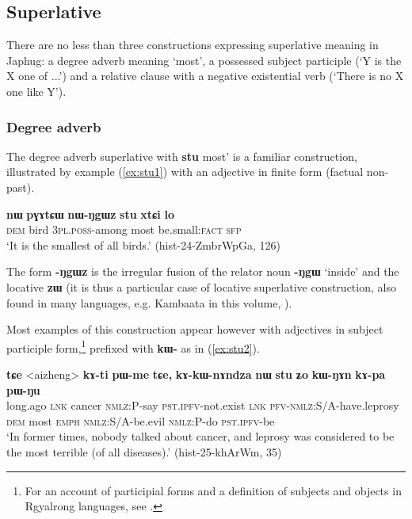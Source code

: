 \documentclass[oneside,a4paper,11pt]{article}
\newcommand{\ipa}[1]{{\phon\textbf{#1}}}
\begin{document}
\subsection{Superlative}
There are no less than three constructions expressing superlative meaning in Japhug: a degree adverb meaning `most', a possessed subject participle (`Y is the X one of ...') and a relative clause with a negative existential verb (`There is no X one like Y').

 \subsubsection{Degree adverb}
 The degree adverb superlative with \ipa{stu}  most' is a familiar construction, illustrated by example (\ref{ex:stu1}) with an adjective in finite form (factual non-past).  
 
\begin{exe}
\ex \label{ex:stu1}
\gll 
\ipa{nɯ} 	\ipa{pɣɤtɕɯ} 	\ipa{nɯ-ŋgɯz} 	\ipa{stu} 	\ipa{xtɕi} 	\ipa{lo} \\
\textsc{dem} bird \textsc{3pl.poss-}among most be.small:\textsc{fact} \textsc{sfp} \\
\glt `It is the smallest of all birds.' (hist-24-ZmbrWpGa, 126)
\end{exe}

The form \ipa{-ŋgɯz} is the irregular fusion of the relator noun \ipa{-ŋgɯ} `inside' and the locative \ipa{zɯ} (it is thus a particular case of locative superlative construction, also found in many languages, e.g. Kambaata in this volume, \citealt{treis17comparison}). 

Most examples of this construction appear however with adjectives in subject participle form,\footnote{For an account of participial forms and a definition of subjects and objects  in Rgyalrong languages, see \citet{jackson03caodeng, jackson14morpho, jacques16relatives}.} prefixed with \ipa{kɯ-} as in (\ref{ex:stu2}).

\begin{exe}
\ex \label{ex:stu2}
\gll \ipa{kɯɕɯŋgɯ} 	\ipa{tɕe} 	<aizheng> 	\ipa{kɤ-ti} 	\ipa{pɯ-me} 	\ipa{tɕe,} 	\ipa{kɤ-kɯ-nɤndza} 	\ipa{nɯ} 	\ipa{stu} 	\ipa{ʑo} 	\ipa{kɯ-ŋɤn} 	\ipa{kɤ-pa} 	\ipa{pɯ-ŋu} \\
long.ago \textsc{lnk} cancer \textsc{nmlz}:P-say \textsc{pst.ipfv}-not.exist \textsc{lnk} \textsc{pfv}-\textsc{nmlz}:S/A-have.leprosy \textsc{dem} most \textsc{emph} \textsc{nmlz}:S/A-be.evil \textsc{nmlz}:P-do \textsc{pst.ipfv}-be \\
\glt `In former times, nobody talked about cancer, and leprosy was considered to be the most terrible (of all diseases).' (hist-25-khArWm, 35)
\end{exe}
\end{document}

